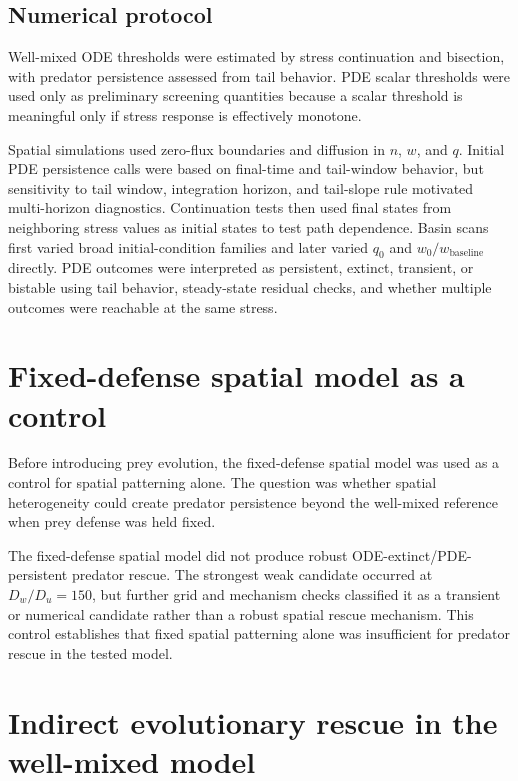\documentclass[11pt]{article}
\begin{document}
\subsection{Numerical protocol}

Well-mixed ODE thresholds were estimated by stress continuation and bisection, with predator persistence assessed from tail behavior. PDE scalar thresholds were used only as preliminary screening quantities because a scalar threshold is meaningful only if stress response is effectively monotone.

Spatial simulations used zero-flux boundaries and diffusion in \(n\), \(w\), and \(q\). Initial PDE persistence calls were based on final-time and tail-window behavior, but sensitivity to tail window, integration horizon, and tail-slope rule motivated multi-horizon diagnostics. Continuation tests then used final states from neighboring stress values as initial states to test path dependence. Basin scans first varied broad initial-condition families and later varied \(q_0\) and \(w_0/w_{\mathrm{baseline}}\) directly. PDE outcomes were interpreted as persistent, extinct, transient, or bistable using tail behavior, steady-state residual checks, and whether multiple outcomes were reachable at the same stress.

\section{Fixed-defense spatial model as a control}

Before introducing prey evolution, the fixed-defense spatial model was used as a control for spatial patterning alone. The question was whether spatial heterogeneity could create predator persistence beyond the well-mixed reference when prey defense was held fixed.

The fixed-defense spatial model did not produce robust ODE-extinct/PDE-persistent predator rescue. The strongest weak candidate occurred at \(D_w/D_u=150\), but further grid and mechanism checks classified it as a transient or numerical candidate rather than a robust spatial rescue mechanism. This control establishes that fixed spatial patterning alone was insufficient for predator rescue in the tested model.

\section{Indirect evolutionary rescue in the well-mixed model}
\end{document}
